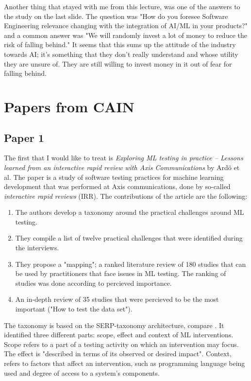 \documentclass{article}
\begin{document}
Another thing that stayed with me from this lecture, was one of the answers to the study on the last slide.
The question was "How do you foresee Software Engineering relevance changing with the integration of AI/ML in
your products?" and a common answer was "We will randomly invest a lot of money to reduce the risk of falling behind."
It seems that this sums up the attitude of the industry towards AI; it's something that they don't really understand and whose utility they are unsure of. They are still willing to invest money in it out of fear for falling behind.

\section{Papers from CAIN}

\subsection{Paper 1}

The first that I would like to treat is \emph{Exploring ML testing in practice – Lessons learned from an
interactive rapid review with Axis Communications} by Ardö et al. \cite{axis}
The paper is a study of software testing practices for machine learning development that was performed at Axis communications, done by so-called \emph{interactive rapid reviews} (IRR). The contributions of the article are the following:
\begin{enumerate}
    \item The authors develop a taxonomy around the practical challenges around ML testing. \label{item1}
    \item They compile a list of twelve practical challenges that were identified during the interviews.
    \label{item2}
    \item They propose a "mapping"; a ranked literature review of 180 studies that can be used by practitioners that face issues in ML testing. The ranking of studies was done according to percieved importance. \label {item3}
    \item An in-depth review of 35 studies that were percieved to be the most important ("How to test the data set").
\end{enumerate}

The taxonomy is based on the SERP-taxonomy architecture, compare \cite{engstrom_2014}. 
It identified three different parts: scope, effect and context of ML interventions.
Scope refers to a part of a testing activity on which an intervention may focus. The effect is "described in terms of its observed or desired impact". Context, refers to factors that affect an intervention, such as programming language being used and degree of access to a system's components.
\end{document}
